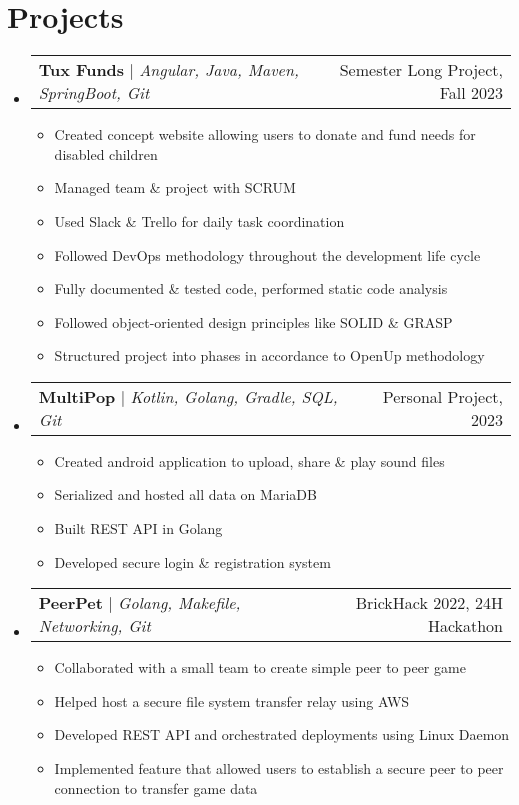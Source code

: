 \documentclass[letterpaper,11pt]{article}
\makeatletter
\newcommand{\resumeItem}[1]{
  \item\small{
    {#1 \vspace{-2pt}}
  }
}
\newcommand{\resumeProjectHeading}[2]{
    \item
    \begin{tabular*}{0.97\textwidth}{l@{\extracolsep{\fill}}r}
      \small#1 & #2 \\
    \end{tabular*}\vspace{-7pt}
}
\newcommand{\resumeSubHeadingListStart}{\begin{itemize}[leftmargin=0.15in, label={}]}
\newcommand{\resumeSubHeadingListEnd}{\end{itemize}}
\newcommand{\resumeItemListStart}{\begin{itemize}}
\newcommand{\resumeItemListEnd}{\end{itemize}\vspace{-5pt}}
\makeatother
\begin{document}
\section{Projects}
\resumeSubHeadingListStart
    \resumeProjectHeading
        {\textbf{Tux Funds} $|$ \emph{Angular, Java, Maven, SpringBoot, Git}}{Semester Long Project, Fall 2023}
    \resumeItemListStart
        \resumeItem{Created concept website allowing users to donate and fund needs for disabled children}
        \resumeItem{Managed team \& project with SCRUM}
        \resumeItem{Used Slack \& Trello for daily task coordination}
        \resumeItem{Followed DevOps methodology throughout the development life cycle}
        \resumeItem{Fully documented \& tested code, performed static code analysis}
        \resumeItem{Followed object-oriented design principles like SOLID \& GRASP}
        \resumeItem{Structured project into phases in accordance to OpenUp methodology}
    \resumeItemListEnd
    \resumeProjectHeading
        {\textbf{MultiPop} $|$ \emph{Kotlin, Golang, Gradle, SQL, Git}}{Personal Project, 2023}
    \resumeItemListStart
        \resumeItem{Created android application to upload, share \& play sound files}
        \resumeItem{Serialized and hosted all data on MariaDB}
        \resumeItem{Built REST API in Golang}
        \resumeItem{Developed secure login \& registration system}
    \resumeItemListEnd
    \resumeProjectHeading
        {\textbf{PeerPet} $|$ \emph{Golang, Makefile, Networking, Git}}{BrickHack 2022, 24H Hackathon}
    \resumeItemListStart
        \resumeItem{Collaborated with a small team to create simple peer to peer game}
        \resumeItem{Helped host a secure file system transfer relay using AWS}
        \resumeItem{Developed REST API and orchestrated deployments using Linux Daemon}
        \resumeItem{Implemented feature that allowed users to establish a secure peer to peer connection to transfer game data}
    \resumeItemListEnd

\resumeSubHeadingListEnd

\end{document}
